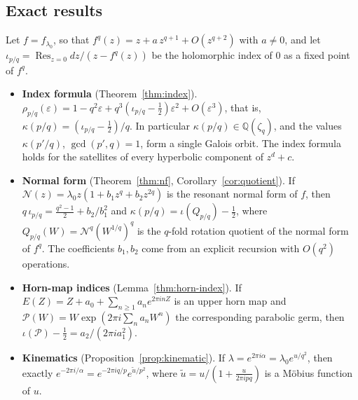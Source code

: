 \documentclass[11pt]{amsart}
\theoremstyle{definition}
\theoremstyle{remark}
\newcommand{\Q}{\mathbb{Q}}
\newcommand{\NF}{\mathcal{N}}
\newcommand{\Res}{\operatorname*{Res}}
\begin{document}
\subsection{Exact results}
Let $f=f_{\lambda_0}$, so that $f^q(z)=z+a\,z^{q+1}+O(z^{q+2})$ with $a\ne0$, and let $\iota_{p/q}=\Res_{z=0}dz/(z-f^q(z))$ be the holomorphic index of $0$ as a fixed point of $f^q$.

\begin{itemize}
\item \textbf{Index formula} (Theorem~\ref{thm:index}). $\rho_{p/q}(\varepsilon)=1-q^2\varepsilon+q^3(\iota_{p/q}-\frac12)\varepsilon^2+O(\varepsilon^3)$, that is, $\kappa(p/q)=(\iota_{p/q}-\frac12)/q$. In particular $\kappa(p/q)\in\Q(\zeta_q)$, and the values $\kappa(p'/q)$, $\gcd(p',q)=1$, form a single Galois orbit. The index formula holds for the satellites of every hyperbolic component of $z^d+c$.
\item \textbf{Normal form} (Theorem~\ref{thm:nf}, Corollary~\ref{cor:quotient}). If $\NF(z)=\lambda_0z(1+b_1z^q+b_2z^{2q})$ is the resonant normal form of $f$, then $q\,\iota_{p/q}=\frac{q^2-1}2+b_2/b_1^2$ and $\kappa(p/q)=\iota(Q_{p/q})-\frac12$, where $Q_{p/q}(W)=\NF^q(W^{1/q})^q$ is the $q$-fold rotation quotient of the normal form of $f^q$. The coefficients $b_1,b_2$ come from an explicit recursion with $O(q^2)$ operations.
\item \textbf{Horn-map indices} (Lemma~\ref{thm:horn-index}). If $E(Z)=Z+a_0+\sum_{n\ge1}a_ne^{2\pi inZ}$ is an upper horn map and $\mathcal P(W)=W\exp(2\pi i\sum_na_nW^n)$ the corresponding parabolic germ, then $\iota(\mathcal P)-\frac12=a_2/(2\pi ia_1^2)$.
\item \textbf{Kinematics} (Proposition~\ref{prop:kinematic}). If $\lambda=e^{2\pi i\alpha}=\lambda_0e^{u/q^2}$, then exactly $e^{-2\pi i/\alpha}=e^{-2\pi iq/p}e^{\tilde u/p^2}$, where $\tilde u=u/(1+\frac{u}{2\pi ipq})$ is a M\"obius function of $u$.
\end{itemize}
\end{document}
